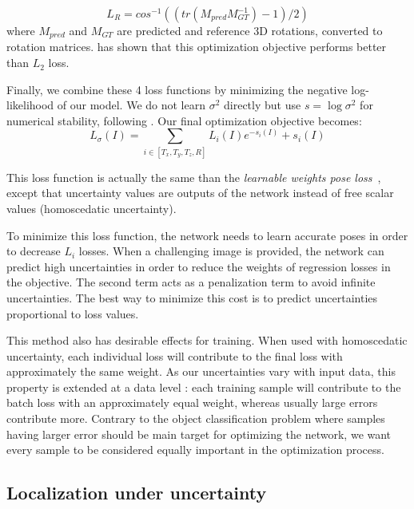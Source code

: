 \documentclass[10pt,twocolumn,letterpaper]{article}
\begin{document}
\begin{equation}
L_R = cos^{-1}((tr(M_{pred} M_{GT}^{-1}) - 1)/2)
\end{equation}
where $M_{pred}$ and $M_{GT}$ are predicted and reference 3D rotations, converted to rotation matrices. \cite{rotation_continuity} has shown that this optimization objective performs better than $L_2$ loss.

Finally, we combine these 4 loss functions by minimizing the negative log-likelihood of our model. We do not learn $\sigma^2$ directly but use $s = \log  \sigma^2$ for numerical stability, following \cite{geometric_loss_function}. Our final optimization objective becomes:
\begin{equation}
L_{\sigma}(I) = \sum_{i \in [T_x, T_y, T_z, R]} L_{i}(I)  e^{-s_{i}(I)} + s_{i}(I)
\label{eq:NLL}
\end{equation}

This loss function is actually the same than the \textit{learnable weights pose loss}~\cite{geometric_loss_function}, except that uncertainty values are outputs of the network instead of free scalar values (homoscedatic uncertainty).

To minimize this loss function, the network needs to learn accurate poses in order to decrease $L_i$ losses. When a challenging image is provided, the network can predict high uncertainties in order to reduce the weights of regression losses in the objective. The second term acts as a penalization term to avoid infinite uncertainties. The best way to minimize this cost is to predict uncertainties proportional to loss values. 

This method also has desirable effects for training. When used with homoscedatic uncertainty, each individual loss will contribute to the final loss with approximately the same weight. As our uncertainties vary with input data, this property is extended at a data level : each training sample will contribute to the batch loss with an approximately equal weight, whereas usually large errors contribute more. 
Contrary to the object classification problem where samples having larger error should be main target for optimizing the network, we want every sample to be considered equally important in the optimization process.

\subsection{Localization under uncertainty}
\label{locunderuncertainty}
\end{document}
